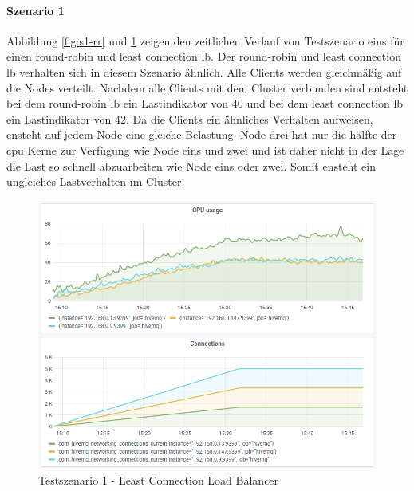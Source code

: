 \paragraph{Szenario 1}
Abbildung \ref{fig:s1-rr} und \ref{fig:s1-lc} zeigen den zeitlichen Verlauf von Testszenario eins für einen round-robin und least connection \acl{lb}.
Der round-robin und least connection \ac{lb} verhalten sich in diesem Szenario ähnlich. Alle Clients werden gleichmä{\ss}ig auf die Nodes verteilt.
Nachdem alle Clients mit dem Cluster verbunden sind entsteht bei dem round-robin \ac{lb} ein Lastindikator von 40 und bei dem least connection \ac{lb} ein Lastindikator von 42.
Da die Clients ein ähnliches Verhalten aufweisen, ensteht auf jedem Node eine gleiche Belastung. Node drei hat nur die hälfte der \ac{cpu} Kerne zur Verfügung wie Node eins und zwei und ist daher nicht in der Lage die Last so schnell abzuarbeiten wie Node eins oder zwei. Somit ensteht ein ungleiches Lastverhalten im Cluster.
\begin{figure}
    \centering
    \includegraphics[scale=0.8]{images/s1_lc.png}
    \caption{Testszenario 1 - Least Connection Load Balancer}
    \label{fig:s1-lc}
\end{figure}

